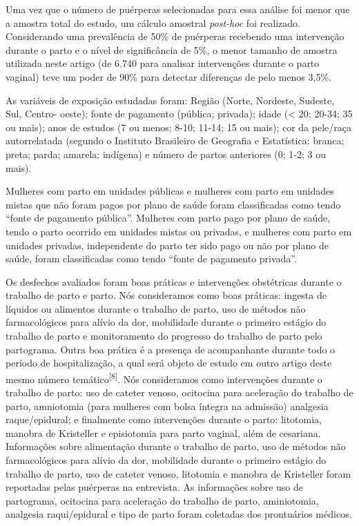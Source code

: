 \documentclass{article}
\begin{document}
Uma vez que o número de puérperas selecionadas para essa análise foi menor que a
amostra total do estudo, um cálculo amostral \textit{post-hoc}
foi
realizado. Considerando uma prevalência de 50\% de puérperas recebendo uma
intervenção durante o parto e o nível de significância de 5\%, o menor tamanho
de
amostra utilizada neste artigo (de 6.740 para analisar intervenções durante o
parto vaginal) teve um poder de 90\% para detectar diferenças de pelo menos
3,5\%.

As variáveis de exposição estudadas foram: Região (Norte, Nordeste, Sudeste,
Sul,
Centro- oeste); fonte de pagamento (pública; privada); idade (< 20; 20-34; 35
ou mais); anos de estudos (7 ou menos; 8-10; 11-14; 15 ou mais); cor da
pele/raça autorrelatada (segundo o Instituto Brasileiro de Geografia e
Estatística: branca; preta; parda; amarela; indígena) e número de partos
anteriores (0; 1-2; 3 ou mais).

Mulheres com parto em unidades públicas e mulheres com parto em unidades mistas
que não foram pagos por plano de saúde foram classificadas como tendo “fonte de
pagamento pública”. Mulheres com parto pago por plano de saúde, tendo o parto
ocorrido em unidades mistas ou privadas, e mulheres com parto em unidades
privadas, independente do parto ter sido pago ou não por plano de saúde, foram
classificadas como tendo “fonte de pagamento privada”.

Os desfechos avaliados foram boas práticas e intervenções obstétricas durante o
trabalho de parto e parto. Nós consideramos como boas práticas: ingesta de
líquidos ou alimentos durante o trabalho de parto, uso de métodos não
farmacológicos para alívio da dor, mobilidade durante o primeiro estágio do
trabalho de parto e monitoramento do progresso do trabalho de parto pelo
partograma. Outra boa prática é a presença de acompanhante durante todo o
período de hospitalização, a qual será objeto de estudo em outro artigo deste
mesmo número temático\textsuperscript{[}\textsuperscript{8}\textsuperscript{]}. Nós
consideramos como intervenções durante o trabalho de parto: uso de cateter
venoso, ocitocina para aceleração do trabalho de parto, amniotomia (para
mulheres com bolsa íntegra na admissão) analgesia raque/epidural; e finalmente
como intervenções durante o parto: litotomia, manobra de Kristeller e
episiotomia para parto vaginal, além de cesariana. Informações sobre alimentação
durante o trabalho de parto, uso de métodos não farmacológicos para alívio da
dor, mobilidade durante o primeiro estágio do trabalho de parto, uso de cateter
venoso, litotomia e manobra de Kristeller foram reportadas pelas puérperas na
entrevista. As informações sobre uso de partograma, ocitocina para aceleração do
trabalho de parto, aminiotomia, analgesia raqui/epidural e tipo de parto foram
coletadas dos prontuários médicos.
\end{document}
